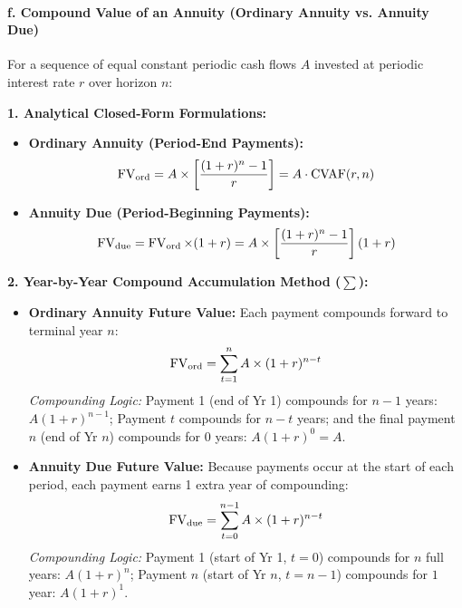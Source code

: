 \begin{formulabox}
\paragraph{f. Compound Value of an Annuity (Ordinary Annuity vs. Annuity Due)}
For a sequence of equal constant periodic cash flows $A$ invested at periodic interest rate $r$ over horizon $n$:

\vspace{0.3em}
\textbf{1. Analytical Closed-Form Formulations:}
\begin{itemize}[leftmargin=*, noitemsep]
    \item \textbf{Ordinary Annuity (Period-End Payments):}
    \begin{equation}
        \operatorname{FV}_{\text{ord}} = A \times \left[ \frac{(1 + r)^n - 1}{r} \right] = A \cdot \operatorname{CVAF}(r, n)
    \end{equation}
    \item \textbf{Annuity Due (Period-Beginning Payments):}
    \begin{equation}
        \operatorname{FV}_{\text{due}} = \operatorname{FV}_{\text{ord}} \times (1 + r) = A \times \left[ \frac{(1 + r)^n - 1}{r} \right] (1 + r)
    \end{equation}
\end{itemize}

\vspace{0.3em}
\textbf{2. Year-by-Year Compound Accumulation Method ($\sum$):}
\begin{itemize}[leftmargin=*]
    \item \textbf{Ordinary Annuity Future Value:} Each payment compounds forward to terminal year $n$:
    \begin{equation}
        \operatorname{FV}_{\text{ord}} = \sum_{t=1}^{n} A \times (1 + r)^{n - t}
    \end{equation}
    \textit{Compounding Logic:} Payment 1 (end of Yr 1) compounds for $n - 1$ years: $A(1+r)^{n-1}$; Payment $t$ compounds for $n - t$ years; and the final payment $n$ (end of Yr $n$) compounds for $0$ years: $A(1+r)^0 = A$.
    \item \textbf{Annuity Due Future Value:} Because payments occur at the start of each period, each payment earns 1 extra year of compounding:
    \begin{equation}
        \operatorname{FV}_{\text{due}} = \sum_{t=0}^{n-1} A \times (1 + r)^{n - t}
    \end{equation}
    \textit{Compounding Logic:} Payment 1 (start of Yr 1, $t=0$) compounds for $n$ full years: $A(1+r)^n$; Payment $n$ (start of Yr $n$, $t=n-1$) compounds for $1$ year: $A(1+r)^1$.
\end{itemize}


\end{formulabox}
